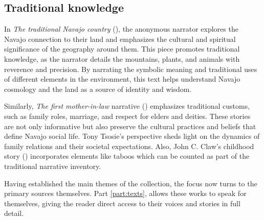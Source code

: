 \subsection{Traditional knowledge}

In \textit{The traditional Navajo country} (), the anonymous narrator explores the Navajo connection to their land and emphasizes the cultural and spiritual significance of the geography around them. This piece promotes traditional knowledge, as the narrator details the mountains, plants, and animals with reverence and precision. By narrating the symbolic meaning and traditional uses of different elements in the environment, this text helps understand Navajo cosmology and the land as a source of identity and wisdom.
	
Similarly, \textit{The first mother-in-law} narrative () emphasizes traditional customs, such as family roles, marriage, and respect for elders and deities. These stories are not only informative but also preserve the cultural practices and beliefs that define Navajo social life. Tony Tsosie's perspective sheds light on the dynamics of family relations and their societal expectations. Also, John C. Claw's childhood story () incorporates elements like taboos which can be counted as part of the traditional narrative inventory.

Having established the main themes of the collection, the focus now turns to the primary sources themselves. Part \ref{part:texts}, allows these works to speak for themselves, giving the reader direct access to their voices and stories in full detail.
